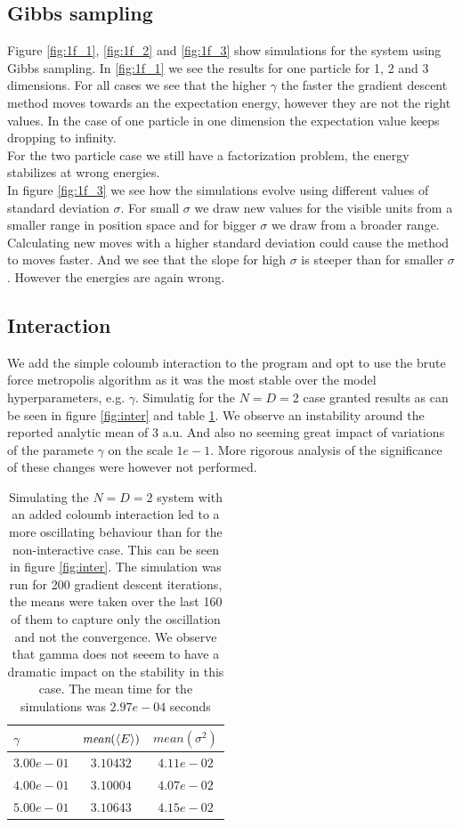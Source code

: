 \subsection{Gibbs sampling}
Figure \ref{fig:1f_1}, \ref{fig:1f_2} and \ref{fig:1f_3} show simulations for the system using Gibbs sampling. In \ref{fig:1f_1} we see the results for one particle for 1, 2 and 3 dimensions. For all cases we see that the higher $\gamma$ the faster the gradient descent method moves towards an the expectation energy, however they are not the right values. In the case of one particle in one dimension the expectation value keeps dropping to infinity. \\
For the two particle case we still have a factorization problem, the energy stabilizes at wrong energies.\\
In figure \ref{fig:1f_3} we see how the simulations evolve using different values of standard deviation $\sigma$. 
For small $\sigma$ we draw new values for the visible units from a smaller range in position space and for bigger $\sigma$ we draw from a broader range. Calculating new moves with a higher standard deviation could cause the method to moves faster. And we see that the slope for high $\sigma$ is steeper than for smaller $\sigma$. However the energies are again wrong.


\subsection{Interaction}
We add the simple coloumb interaction to the program and opt to use the brute force metropolis algorithm as it was the most stable over the model hyperparameters, e.g. $\gamma$. Simulatig for the $N = D = 2$ case granted results as can be seen in figure \ref{fig:inter} and table \ref{tab:inter}. We observe an instability around the reported analytic mean of 3 a.u. And also no seeming great impact of variations of the paramete $\gamma$ on the scale $1e-1$. More rigorous analysis of the significance of these changes were however not performed. 

\begin{table}
	\begin{tabular}{|l|c|c|}
	\hline
$\gamma$ & $\textit{mean}(\langle E \rangle)$ & $\textit{mean}(\sigma ^2)$ \\
\hline \hline
$3.00e-01$ & $3.10432$ & $4.11e-02$ \\
$4.00e-01$ &  $3.10004$ & $4.07e-02$ \\
$5.00e-01$ &  $3.10643$ & $4.15e-02$ \\
\hline
	\end{tabular}
\caption{Simulating the $N = D = 2$ system with an added coloumb interaction led to a more oscillating behaviour than for the non-interactive case. This can be seen in figure \ref{fig:inter}. The simulation was run for 200 gradient descent iterations, the means were taken over the last 160 of them to capture only the oscillation and not the convergence. We observe that gamma does not seeem to have a dramatic impact on the stability in this case. The mean time for the simulations was $2.97e-04$ seconds}\label{tab:inter}
\end{table}


